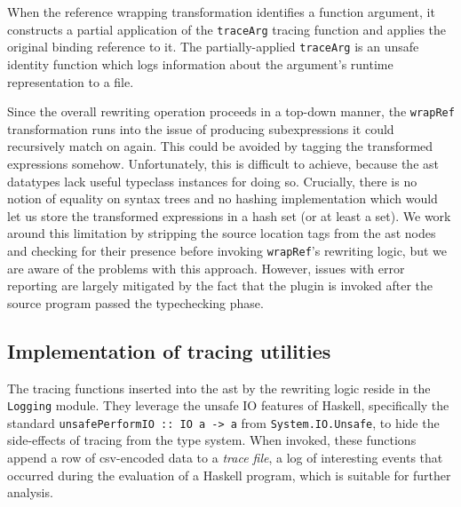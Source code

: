 \documentclass[thesis=B,english]{FITthesis}[2019/12/23]
\newcommand{\hsIdent}[1]{\texttt{#1}}
\newcommand{\hsModule}[1]{\texttt{#1}}
\newcommand{\hsCode}[1]{\texttt{#1}}
\begin{document}
\begin{description}
		When the reference wrapping transformation identifies a function
		argument, it constructs a partial application of the \hsIdent{traceArg}
		tracing function and applies the original binding reference to it. The
		partially-applied \hsIdent{traceArg} is an unsafe identity function
		which logs information about the argument's runtime representation to a
		file.

		Since the overall rewriting operation proceeds in a top-down manner,
		the \hsIdent{wrapRef} transformation runs into the issue of producing
		subexpressions it could recursively match on again. This could be
		avoided by tagging the transformed expressions somehow. Unfortunately,
		this is difficult to achieve, because the \acrshort{ast} datatypes lack
		useful typeclass instances for doing so. Crucially, there is no notion
		of equality on syntax trees and no hashing implementation which would
		let us store the transformed expressions in a hash set (or at least a
		set). We work around this limitation by stripping the source location
		tags from the \acrshort{ast} nodes and checking for their presence
		before invoking \hsIdent{wrapRef}'s rewriting logic, but we are aware
		of the problems with this approach. However, issues with error
		reporting are largely mitigated by the fact that the plugin is invoked
		after the source program passed the typechecking phase.
\end{description}

\subsection*{Implementation of tracing utilities} \label{sec:tracing-util-impl}
The tracing functions inserted into the \acrshort{ast} by the rewriting logic
reside in the \hsModule{Logging} module. They leverage the unsafe IO features
of Haskell, specifically the standard \hsCode{unsafePerformIO :: IO a -> a}
from \hsModule{System.IO.Unsafe}, to hide the side-effects of tracing from the
type system. When invoked, these functions append a row of
\acrshort{csv}-encoded data to a \textit{trace file}, a log of interesting
events that occurred during the evaluation of a Haskell program, which is
suitable for further analysis.
\end{document}
